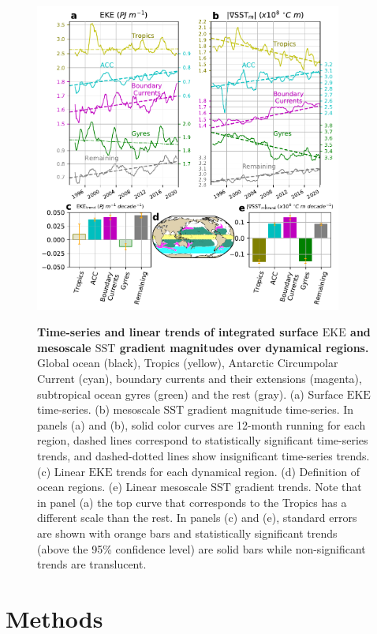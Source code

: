 \documentclass{nature}
\newcommand{\EKE}{\text{EKE}}
\newcommand{\SST}{\text{SST}}
\begin{document}
\begin{figure}
    \centering
	\includegraphics[width=0.90\textwidth]{./figures/global_processes_trends_FV.pdf}\\
	\caption{
	\textbf{Time-series and linear trends of integrated surface $\EKE$ and mesoscale $\SST$ gradient magnitudes over dynamical regions.} Global ocean (black), Tropics (yellow), Antarctic Circumpolar Current (cyan), boundary currents and their extensions (magenta), subtropical ocean gyres (green) and the rest (gray). (a) Surface $\EKE$ time-series. (b) mesoscale $\SST$ gradient magnitude time-series. In panels (a) and (b), solid color curves are 12-month running for each region, dashed lines correspond to statistically significant time-series trends, and dashed-dotted lines show insignificant time-series trends. (c) Linear $\EKE$ trends for each dynamical region. (d) Definition of ocean regions. (e) Linear mesoscale $\SST$ gradient trends. Note that in panel (a) the top curve that corresponds to the Tropics has a different scale than the rest.
	In panels (c) and (e), standard errors are shown with orange bars and statistically significant trends (above the 95\% confidence level) are solid bars while non-significant trends are translucent. \label{fig:process_trends}
	}
\end{figure}

\newpage

\section*{Methods}
\end{document}
